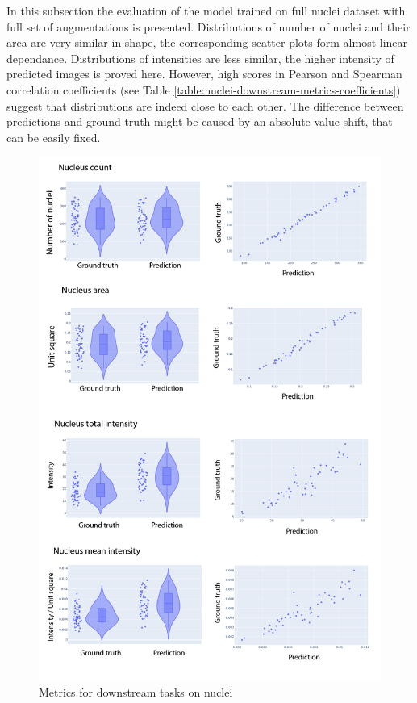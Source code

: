 In this subsection the evaluation of the model trained on full nuclei dataset with full set of augmentations is presented. Distributions of number of nuclei and their area are very similar in shape, the corresponding scatter plots form almost linear dependance. Distributions of intensities are less similar, the higher intensity of predicted images is proved here. However, high scores in Pearson and Spearman correlation coefficients (see Table \ref{table:nuclei-downstream-metrics-coefficients}) suggest that distributions are indeed close to each other. The difference between predictions and ground truth might be caused by an absolute value shift, that can be easily fixed.
\begin{figure}[htb]
	\begin{center}
		\includegraphics[width=0.8\linewidth]{bilder/nuclei/metric/combined-metrics.png}
		\caption{Metrics for downstream tasks on nuclei}\label{fig:nuclei-downstream-metrics}
	\end{center}
\end{figure}

